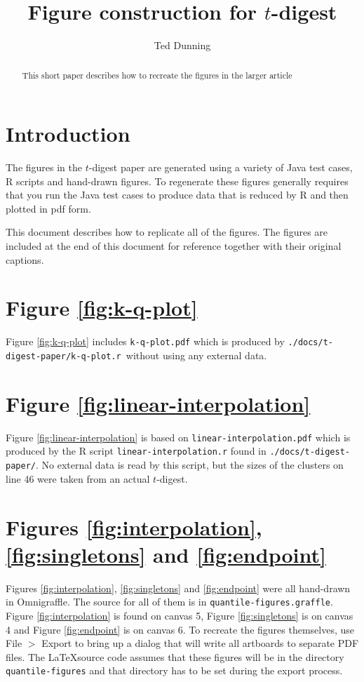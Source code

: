 \documentclass[]{statsoc}
\title[Figure construction]{Figure construction for $t$-digest}
\author{Ted Dunning}
\date{}                                           %
\begin{document}
\begin{abstract}
This short paper describes how to recreate the figures in the larger article
\end{abstract}
\maketitle
\section{Introduction}
The figures in the $t$-digest paper are generated using a variety of Java test cases, R scripts and hand-drawn figures. To regenerate these figures generally requires that you run the Java test cases to produce data that is reduced by R and then plotted in pdf form.

This document describes how to replicate all of the figures. The figures are included at the end of this document for reference together with their original captions.
\section{Figure \ref{fig:k-q-plot}}
Figure \ref{fig:k-q-plot} includes {\tt k-q-plot.pdf} which is produced by {\tt ./docs/t-digest-paper/k-q-plot.r }without using any external data.
\section{Figure \ref{fig:linear-interpolation}}
Figure \ref{fig:linear-interpolation} is based on {\tt linear-interpolation.pdf} which is produced by the R script {\tt linear-interpolation.r} found in {\tt ./docs/t-digest-paper/}. No external data is read by this script, but the sizes of the clusters on line 46 were taken from an actual $t$-digest.

\section{Figures \ref{fig:interpolation}, \ref{fig:singletons} and \ref{fig:endpoint}}
Figures \ref{fig:interpolation}, \ref{fig:singletons} and \ref{fig:endpoint} were all hand-drawn in Omnigraffle. The source for all of them is in {\tt quantile-figures.graffle}. Figure \ref{fig:interpolation} is found on canvas 5, Figure \ref{fig:singletons} is on canvas 4 and Figure \ref{fig:endpoint} is on canvas 6. To recreate the figures themselves, use File $>$ Export to bring up a dialog that will write all artboards to separate PDF files. The  \LaTeX source code assumes that these figures will be in the directory {\tt quantile-figures} and that directory has to be set during the export process.
\end{document}
